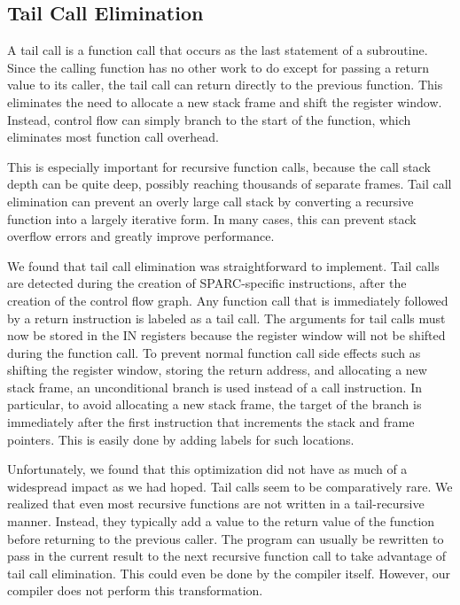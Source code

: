 \documentclass[12pt]{article}
\begin{document}
\subsection{Tail Call Elimination}
A tail call is a function call that occurs as the last statement of a subroutine.
Since the calling function has no other work to do except for passing a return value to its caller, the tail call can return directly to the previous function.
This eliminates the need to allocate a new stack frame and shift the register window.
Instead, control flow can simply branch to the start of the function, which eliminates most function call overhead.

This is especially important for recursive function calls, because the call stack depth can be quite deep, possibly reaching thousands of separate frames.
Tail call elimination can prevent an overly large call stack by converting a recursive function into a largely iterative form.
In many cases, this can prevent stack overflow errors and greatly improve performance.

We found that tail call elimination was straightforward to implement.
Tail calls are detected during the creation of SPARC-specific instructions, after the creation of the control flow graph.
Any function call that is immediately followed by a return instruction is labeled as a tail call.
The arguments for tail calls must now be stored in the IN registers because the register window will not be shifted during the function call.
To prevent normal function call side effects such as shifting the register window, storing the return address, and allocating a new stack frame, an unconditional branch is used instead of a call instruction.
In particular, to avoid allocating a new stack frame, the target of the branch is immediately after the first instruction that increments the stack and frame pointers.
This is easily done by adding labels for such locations.

Unfortunately, we found that this optimization did not have as much of a widespread impact as we had hoped.
Tail calls seem to be comparatively rare.
We realized that even most recursive functions are not written in a tail-recursive manner.
Instead, they typically add a value to the return value of the function before returning to the previous caller.
The program can usually be rewritten to pass in the current result to the next recursive function call to take advantage of tail call elimination.
This could even be done by the compiler itself.
However, our compiler does not perform this transformation.
\end{document}
